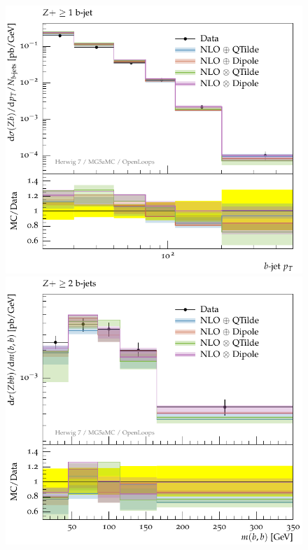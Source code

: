 \documentclass[11pt]{cernrep}
\begin{document}
\begin{figure}[htbp]
\begin{center}
   \includegraphics[scale=0.65]{figs/zbb/herwigzb/atlas-d03-x01-y01.pdf}
   \includegraphics[scale=0.65]{figs/zbb/herwigzb/atlas-d23-x01-y01.pdf} \\

\end{center}
\end{figure}
\end{document}
